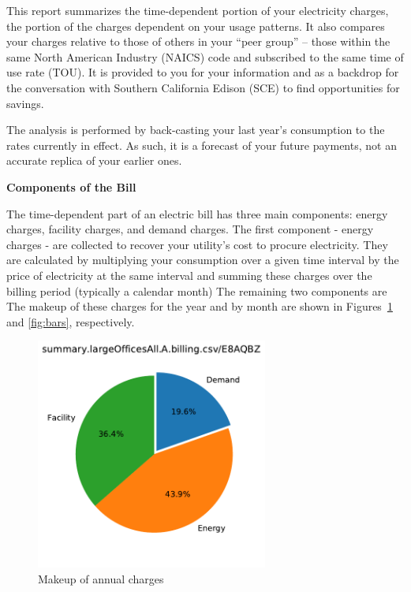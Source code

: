 \documentclass[11pt]{article}
\begin{document}
\pagestyle{title}
This report summarizes the time-dependent portion of your electricity charges, the portion of the charges dependent on your usage patterns. It also compares your charges relative to those of others in your ``peer group'' -- those within the same North American Industry (NAICS) code and subscribed to the same time of use rate (TOU). It is provided to you for your information and as a backdrop for the conversation with Southern California Edison (SCE) to find opportunities for savings.

The analysis is performed by back-casting your last year's consumption to the rates currently in effect. As such, it is a forecast of your future payments, not an accurate replica of your earlier ones. 

\vspace{3ex}
\textbf{\Large Components of the Bill}
\vspace{1ex}

The time-dependent part of an electric bill has three main components: energy charges, facility charges, and demand charges. The first component - energy charges - are collected to recover your utility's cost to procure electricity. They are calculated by multiplying your consumption over a given time interval by the price of electricity at the same interval and summing these charges over the billing period (typically a calendar month) The remaining two components are  The makeup of these charges for the year and by month are shown in Figures~\ref{fig:pie} and \ref{fig:bars}, respectively.
\begin{figure}[!h]
\centering
\includegraphics[height=3in, page=1, trim=0in 0.45in 0in 0.45in, clip]{visuals/E8AQBZ.piechart.pdf}
\caption{Makeup of annual charges}
\label{fig:pie}
\end{figure}
\end{document}
